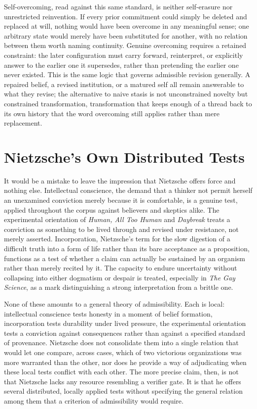 \documentclass[11pt]{article}
\begin{document}
Self-overcoming, read against this same standard, is neither self-erasure nor unrestricted reinvention. If every prior commitment could simply be deleted and replaced at will, nothing would have been overcome in any meaningful sense; one arbitrary state would merely have been substituted for another, with no relation between them worth naming continuity. Genuine overcoming requires a retained constraint: the later configuration must carry forward, reinterpret, or explicitly answer to the earlier one it supersedes, rather than pretending the earlier one never existed. This is the same logic that governs admissible revision generally. A repaired belief, a revised institution, or a matured self all remain answerable to what they revise; the alternative to naive stasis is not unconstrained novelty but constrained transformation, transformation that keeps enough of a thread back to its own history that the word overcoming still applies rather than mere replacement.

\section*{Nietzsche's Own Distributed Tests}

It would be a mistake to leave the impression that Nietzsche offers force and nothing else. Intellectual conscience, the demand that a thinker not permit herself an unexamined conviction merely because it is comfortable, is a genuine test, applied throughout the corpus against believers and skeptics alike. The experimental orientation of \emph{Human, All Too Human} and \emph{Daybreak} treats a conviction as something to be lived through and revised under resistance, not merely asserted. Incorporation, Nietzsche's term for the slow digestion of a difficult truth into a form of life rather than its bare acceptance as a proposition, functions as a test of whether a claim can actually be sustained by an organism rather than merely recited by it. The capacity to endure uncertainty without collapsing into either dogmatism or despair is treated, especially in \emph{The Gay Science}, as a mark distinguishing a strong interpretation from a brittle one.

None of these amounts to a general theory of admissibility. Each is local: intellectual conscience tests honesty in a moment of belief formation, incorporation tests durability under lived pressure, the experimental orientation tests a conviction against consequences rather than against a specified standard of provenance. Nietzsche does not consolidate them into a single relation that would let one compare, across cases, which of two victorious organizations was more warranted than the other, nor does he provide a way of adjudicating when these local tests conflict with each other. The more precise claim, then, is not that Nietzsche lacks any resource resembling a verifier gate. It is that he offers several distributed, locally applied tests without specifying the general relation among them that a criterion of admissibility would require.
\end{document}
